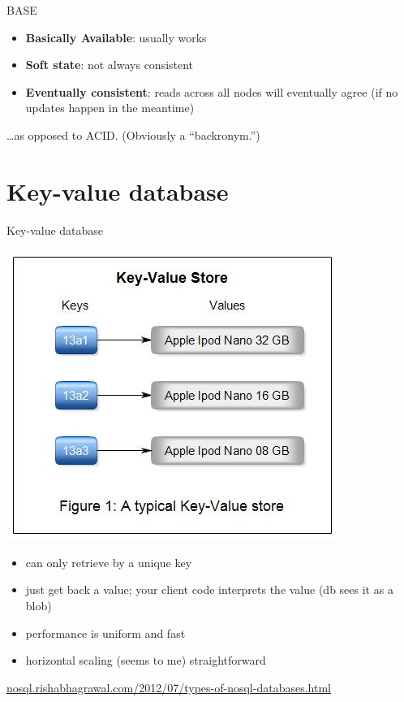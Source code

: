 \documentclass{beamer}
\begin{document}
\begin{frame}{BASE}

  \begin{itemize}
  \item \textbf{Basically Available}: usually works
  \item \textbf{Soft state}: not always consistent
  \item \textbf{Eventually consistent}: reads across all nodes will
    eventually agree (if no updates happen in the meantime)
  \end{itemize}

  \vskip 0.5in

  \dots as opposed to ACID. (Obviously a ``backronym.'')

\end{frame}

\section{Key-value database}

\begin{frame}{Key-value database}

  \begin{center}
    \includegraphics[width=0.5\linewidth]{key-value.jpg}
  \end{center}

  \begin{itemize}
  \item can only retrieve by a unique key
  \item just get back a value; your client code interprets the value
    (db sees it as a blob)
  \item performance is uniform and fast
  \item horizontal scaling (seems to me) straightforward
  \end{itemize}

  {\footnotesize \url{nosql.rishabhagrawal.com/2012/07/types-of-nosql-databases.html}}


\end{frame}
\end{document}
